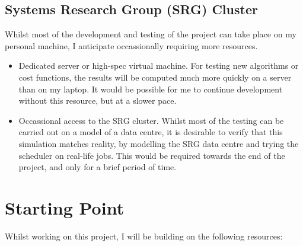 \subsection*{Systems Research Group (SRG) Cluster}
Whilst most of the development and testing of the project can take place on my personal machine, I anticipate occassionally requiring more resources.

\begin{itemize}
  \item Dedicated server or high-spec virtual machine. For testing new algorithms or cost functions, the results will be computed much more quickly on a server than on my laptop. It would be possible for me to continue development without this resource, but at a slower pace.
  \item Occassional access to the SRG cluster. Whilst most of the testing can be carried out on a model of a data centre, it is desirable to verify that this simulation matches reality, by modelling the SRG data centre and trying the scheduler on real-life jobs. This would be required towards the end of the project, and only for a brief period of time.
\end{itemize}

\section*{Starting Point}
Whilst working on this project, I will be building on the following resources:

